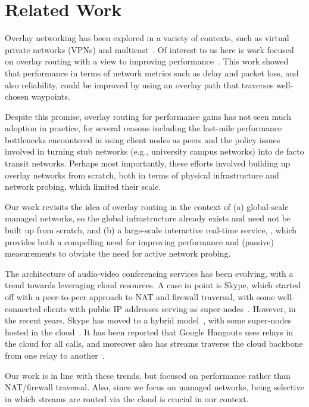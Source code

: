 \section{Related Work}
\label{sec:via:related}


Overlay networking has been explored in a variety of contexts, such as virtual private networks (VPNs) and multicast~\cite{MBone-Eriksson94,ALMI-USITS01,Multicast-Sigcomm02}. Of interest to us here is work focused on overlay routing with a view to improving performance~\cite{Detour-Sigcomm99,RON-SOSP01}. This work showed that performance in terms of network metrics such as delay and packet loss, and also reliability, could be improved by using an overlay path that traverses well-chosen waypoints. 

Despite this promise,  overlay routing for performance gains has not seen much adoption in practice, for several reasons including the last-mile performance bottlenecks encountered in using client nodes as peers and the policy issues involved in turning stub networks (e.g., university campus networks) into de facto transit networks. Perhaps most importantly, these efforts involved building up overlay networks from scratch, both in terms of physical infrastructure and network probing, which limited their scale.

Our work revisits the idea of overlay routing in the context of (a) global-scale managed networks, so the global infrastructure already exists and need not be built up from scratch, and (b) a large-scale interactive real-time service, \skype, which provides both a compelling need for improving performance and (passive) measurements to obviate the need for active network probing.


 The architecture of audio-video conferencing services has been evolving, with a trend towards leveraging cloud resources. A case in point is Skype, which started off with a peer-to-peer approach to NAT and firewall traversal, with some well-connected clients with public IP addresses serving as super-nodes~\cite{Skype-GI08}. However, in the recent years, Skype has moved to a hybrid model~\cite{VideoTelephony-IMC12}, with some super-nodes hosted in the cloud~\cite{Skype-Zdnet13}. 
It has been reported that Google Hangouts uses relays in the cloud for all calls, and moreover also has streams traverse the cloud backbone from one relay to another~\cite{VideoTelephony-IMC12}. 

Our work is in line with these trends, but focused on performance rather than NAT/firewall traversal. Also, since we focus on managed networks, being selective in which streams are routed via the cloud is crucial in our context.

